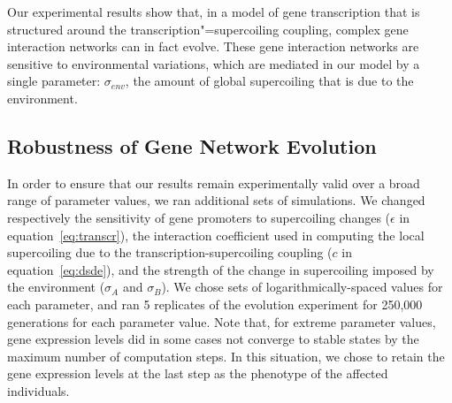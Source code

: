 Our experimental results show that, in a model of gene transcription that is structured around the transcription"=supercoiling coupling, complex gene interaction networks can in fact evolve.
These gene interaction networks are sensitive to environmental variations, which are mediated in our model by a single parameter: $\sigma_{env}$, the amount of global supercoiling that is due to the environment.

\subsection{Robustness of Gene Network Evolution}
\label{sec:alife:param_explor}

In order to ensure that our results remain experimentally valid over a broad range of parameter values, we ran additional sets of simulations.
We changed respectively the sensitivity of gene promoters to supercoiling changes ($\epsilon$ in equation~\ref{eq:transcr}), the interaction coefficient used in computing the local supercoiling due to the transcription-supercoiling coupling ($c$ in equation~\ref{eq:dsde}), and the strength of the change in supercoiling imposed by the environment ($\sigma_A$ and $\sigma_B$).
We chose sets of logarithmically-spaced values for each parameter, and ran 5 replicates of the evolution experiment for 250,000 generations for each parameter value.
Note that, for extreme parameter values, gene expression levels did in some cases not converge to stable states by the maximum number of computation steps.
In this situation, we chose to retain the gene expression levels at the last step as the phenotype of the affected individuals.

